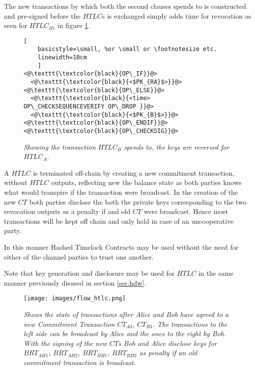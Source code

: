 The new transactions by which both the second clauses spends to is constructed and pre-signed before the $HTLC$s is exchanged simply adds time for revocation as seen for $HTLC_{B1}$ in figure \ref{fig:timeout:tx}.

\begin{figure}[hbt!]
	
	\centering
	
	\begin{lstlisting}[
	basicstyle=\small, %or \small or \footnotesize etc.
	linewidth=10cm
	]
<@\texttt{\textcolor{black}{OP\_IF}}@>
  <@\texttt{\textcolor{black}{<$PK_{RA}$>}}@>
<@\texttt{\textcolor{black}{OP\_ELSE}}@>
  <@\texttt{\textcolor{black}{<time> OP\_CHECKSEQUENCEVERIFY OP\_DROP }}@>
  <@\texttt{\textcolor{black}{<$PK_{B}$>}}@>
<@\texttt{\textcolor{black}{OP\_ENDIF}}@>
<@\texttt{\textcolor{black}{OP\_CHECKSIG}}@>
	\end{lstlisting}
	
	\caption{\textit{ Showing the transaction $HTLC_{B}$ spends to, the keys are reversed for $HTLC_{A}$.
	}}
	\label{fig:timeout:tx}
\end{figure}

A $HTLC$ is terminated off-chain by creating a new commitment transaction, without $HTLC$ outputs, reflecting new the balance state as both parties knows what would transpire if the transaction were broadcast. In the creation of the new $CT$ both parties disclose the both the private keys corresponding to the two revocation outputs as a penalty if and old $CT$ were broadcast. Hence most transactions will be kept off chain and only held in case of an uncooperative party.

In this manner Hashed Timelock Contracts may be used without the need for either of the channel parties to trust one another.

Note that key generation and disclosure may be used for $HTLC$ in the same manner previously disused in section \ref{sec:hdw}.

\newpage
\onecolumn

\begin{figure}[!htb]

	\centering
	\texttt{[image: images/flow\_htlc.png]}

	\caption{\textit{
			Shows the state of transactions after Alice and Bob have agreed to a new Commitment Transaction $CT_{A3}$, $CT_{B3}$. 
			The transactions to the left side can be broadcast by Alice and the ones to the right by Bob. With the signing of the new $CT$s
			Bob and Alice disclose keys for $BRT_{AH1}$, $BRT_{AH2}$, $BRT_{BH1}$, $BRT_{BH2}$ as penalty if an old commitment transaction is broadcast.
		}}
\end{figure}
\newpage
\twocolumn

